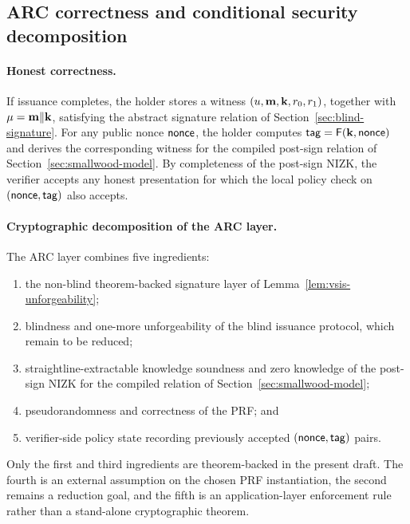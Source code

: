 \subsection{ARC correctness and conditional security decomposition}

\paragraph{Honest correctness.}
If issuance completes, the holder stores a witness \((u,\mathbf{m},\mathbf{k},r_0,r_1)\), together with
\(\mathbf{\mu}=\mathbf{m}\Vert \mathbf{k}\), satisfying the abstract signature relation
of Section~\ref{sec:blind-signature}. For any public nonce \(\mathsf{nonce}\), the holder computes
\(\mathsf{tag} = \mathsf{F}(\mathbf{k},\mathsf{nonce})\) and derives the corresponding witness for the compiled post-sign relation of
Section~\ref{sec:smallwood-model}. By completeness of the post-sign NIZK, the verifier accepts any honest presentation
for which the local policy check on \((\mathsf{nonce},\mathsf{tag})\) also accepts.

\paragraph{Cryptographic decomposition of the ARC layer.}
The ARC layer combines five ingredients:
\begin{enumerate}[leftmargin=1.25em]
    \item the non-blind theorem-backed signature layer of Lemma~\ref{lem:vsis-unforgeability};
    \item blindness and one-more unforgeability of the blind issuance protocol, which remain to be reduced;
    \item straightline-extractable knowledge soundness and zero knowledge of the post-sign NIZK for the compiled relation of Section~\ref{sec:smallwood-model};
    \item pseudorandomness and correctness of the PRF; and
    \item verifier-side policy state recording previously accepted \((\mathsf{nonce},\mathsf{tag})\) pairs.
\end{enumerate}
Only the first and third ingredients are theorem-backed in the present draft. The fourth is an external assumption on
the chosen PRF instantiation, the second remains a reduction goal, and the fifth is an application-layer enforcement
rule rather than a stand-alone cryptographic theorem.

